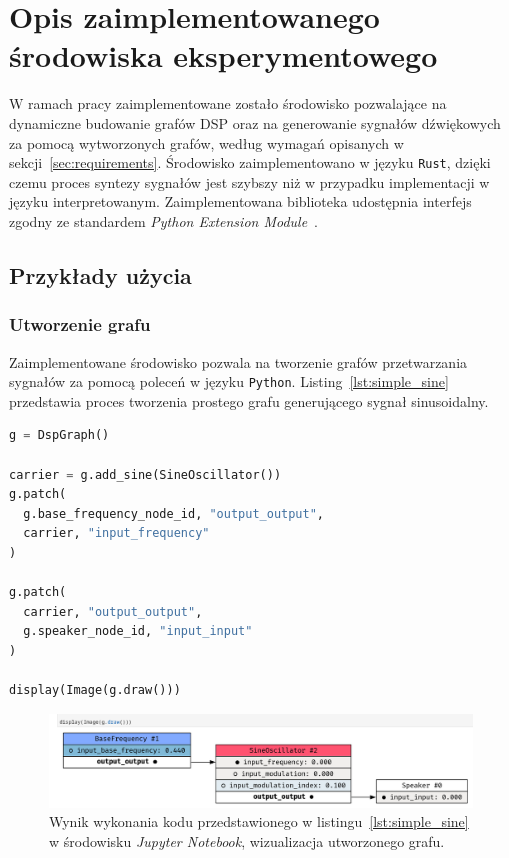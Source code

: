 \section{Opis zaimplementowanego środowiska eksperymentowego}

W ramach pracy zaimplementowane zostało środowisko pozwalające na dynamiczne budowanie grafów DSP oraz
na generowanie sygnałów dźwiękowych za pomocą wytworzonych grafów,
według wymagań opisanych w sekcji~\ref{sec:requirements}. Środowisko zaimplementowano w języku \texttt{Rust},
dzięki czemu proces syntezy sygnałów jest szybszy niż w przypadku implementacji w języku interpretowanym.
Zaimplementowana biblioteka udostępnia interfejs zgodny ze standardem
\textit{Python Extension Module}~\cite{python_extension_module}.

\subsection{Przykłady użycia}

\subsubsection{Utworzenie grafu}

Zaimplementowane środowisko pozwala na tworzenie grafów przetwarzania sygnałów za pomocą poleceń w języku \texttt{Python}.
Listing~\ref{lst:simple_sine} przedstawia proces tworzenia prostego grafu generującego sygnał sinusoidalny.

\begin{lstlisting}[language=python, caption=Utworzenie prostego grafu generującego sygnał sinusoidalny., label={lst:simple_sine}]
g = DspGraph()

carrier = g.add_sine(SineOscillator())
g.patch(
  g.base_frequency_node_id, "output_output",
  carrier, "input_frequency"
)

g.patch(
  carrier, "output_output",
  g.speaker_node_id, "input_input"
)

display(Image(g.draw()))
\end{lstlisting}

\begin{figure}[H]\label{fig:example_graph_creation_jupyter}
    \centering
    \includegraphics[width=1.0\linewidth]{rys02/simple_graph_creation_example.png}
    \caption{
      Wynik wykonania kodu przedstawionego w listingu~\ref{lst:simple_sine} w środowisku \textit{Jupyter Notebook},
      wizualizacja utworzonego grafu.
    }
\end{figure}

